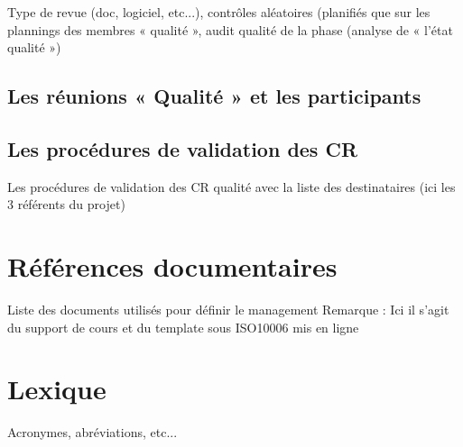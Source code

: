 \documentclass[a4paper, 10pt, oneside]{report}
\begin{document}
Type de revue (doc, logiciel, etc...), contrôles aléatoires (planifiés que sur les plannings des membres « qualité », audit qualité de la phase (analyse de « l’état qualité »)

\section{Les réunions « Qualité » et les participants}

\section{Les procédures de validation des CR}

Les procédures de validation des CR qualité avec la liste des destinataires (ici les 3 référents du projet)


\chapter{Références documentaires}

Liste des documents utilisés pour définir le management
Remarque : Ici il s’agit du support de cours et du template sous ISO10006 mis en ligne

\chapter{Lexique}

Acronymes, abréviations, etc...
\end{document}
